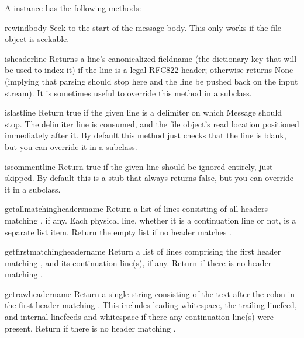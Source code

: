 A  instance has the following methods:

\begin{methoddesc}{rewindbody}{}
Seek to the start of the message body.  This only works if the file
object is seekable.
\end{methoddesc}

\begin{methoddesc}{isheader}{line}
Returns a line's canonicalized fieldname (the dictionary key that will
be used to index it) if the line is a legal RFC822 header; otherwise
returns None (implying that parsing should stop here and the line be
pushed back on the input stream).  It is sometimes useful to override
this method in a subclass.
\end{methoddesc}

\begin{methoddesc}{islast}{line}
Return true if the given line is a delimiter on which Message should
stop.  The delimiter line is consumed, and the file object's read
location positioned immediately after it.  By default this method just
checks that the line is blank, but you can override it in a subclass.
\end{methoddesc}

\begin{methoddesc}{iscomment}{line}
Return true if the given line should be ignored entirely, just skipped.
By default this is a stub that always returns false, but you can
override it in a subclass.
\end{methoddesc}

\begin{methoddesc}{getallmatchingheaders}{name}
Return a list of lines consisting of all headers matching
, if any.  Each physical line, whether it is a continuation
line or not, is a separate list item.  Return the empty list if no
header matches .
\end{methoddesc}

\begin{methoddesc}{getfirstmatchingheader}{name}
Return a list of lines comprising the first header matching
, and its continuation line(s), if any.  Return 
if there is no header matching .
\end{methoddesc}

\begin{methoddesc}{getrawheader}{name}
Return a single string consisting of the text after the colon in the
first header matching .  This includes leading whitespace,
the trailing linefeed, and internal linefeeds and whitespace if there
any continuation line(s) were present.  Return  if there is
no header matching .
\end{methoddesc}

